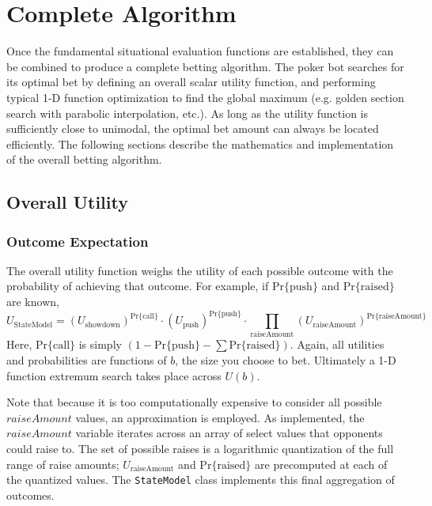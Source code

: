 


\chapter{Complete Algorithm}
\label{sec:CompleteAlgorithm}

Once the fundamental situational evaluation functions are established, they can be combined to produce a complete betting algorithm.
The poker bot searches for its optimal bet by defining an overall scalar utility function, and performing typical 1-D function optimization to find the global maximum (e.g. golden section search with parabolic interpolation, etc.).
As long as the utility function is sufficiently close to unimodal, the optimal bet amount can always be located efficiently.
The following sections describe the mathematics and implementation of the overall betting algorithm.

\section{Overall Utility}



\subsection{Outcome Expectation}
\label{sec:StateModel}

The overall utility function weighs the utility of each possible outcome with the probability of achieving that outcome.
For example, if $\mathrm{Pr\{push}\}$ and $\mathrm{Pr\{raised}\}$ are known, %
\[
U_{\mathrm{StateModel}} = \left(U_{\mathrm{showdown}}\right)^{\mathrm{Pr\{call\}}} \cdot \left(U_{\mathrm{push}}\right)^{\mathrm{Pr\{push}\}} \cdot \prod_{\mathrm{raiseAmount}} \left(U_{\mathrm{raiseAmount}}\right)^{\mathrm{Pr\{raiseAmount}\}}
\]
Here, $\mathrm{Pr\{call\}}$ is simply $\left(1 - \mathrm{Pr\{push}\} - \sum \mathrm{Pr\{raised}\}\right)$.
Again, all utilities and probabilities are functions of $b$, the size you choose to bet.
Ultimately a 1-D function extremum search takes place across $U\left(b\right)$.

Note that because it is too computationally expensive to consider all possible $raiseAmount$ values, an approximation is employed.
As implemented, the $raiseAmount$ variable iterates across an array of select values that opponents could raise to.
The set of possible raises is a logarithmic quantization of the full range of raise amounts; $U_{\mathrm{raiseAmount}}$ and $\mathrm{Pr\{raised}\}$ are precomputed at each of the quantized values.
The \texttt{StateModel} class implements this final aggregation of outcomes.

